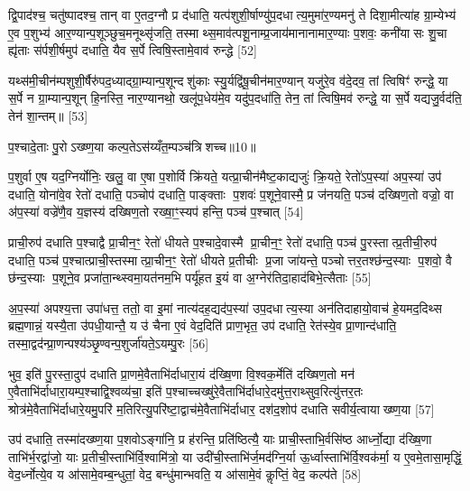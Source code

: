 द्वि॒पाद॑श्च॒ चतु॑ष्पादश्च॒ तान् वा ए॒तद॒ग्नौ प्र द॑धाति॒ यत्प॑शुशी॒र्\mbox{}षाण्यु॑प॒दधात्य॒मुमा॑र॒ण्यमनु॑ ते दिशा॒मीत्या॑ह ग्रा॒म्येभ्य॑ ए॒व प॒शुभ्य॑ आर॒ण्यान्प॒शूञ्छुच॒मनूथ्सृ॑जति॒ तस्माथ्स॒माव॑त्पशू॒नाम्प्र॒जाय॑मानानामार॒ण्याः प॒शवः॒ कनी॑यासः शु॒चा ह्यृ॑ताः स॑र्पशी॒र्\mbox{}षमुप॑ दधाति॒ यैव स॒र्पे त्विषि॒स्तामे॒वाव॑ रुन्द्धे [52]

यथ्स॑मी॒चीन॑म्पशुशी॒र्\mbox{}षैरु॑पद॒ध्याद्ग्रा॒म्यान्प॒शून्दशु॑काः स्यु॒र्यद्वि॑षू॒चीन॑मार॒ण्यान् यजु॑रे॒व व॑दे॒दव॒ तां त्विषिꣳ॑ रुन्द्धे॒ या स॒र्पे न ग्रा॒म्यान्प॒शून् हि॒नस्ति॒ नार॒ण्यानथो॒ खलू॑प॒धेय॑मे॒व यदु॑प॒दधा॑ति॒ तेन॒ तां त्विषि॒मव॑ रुन्द्धे॒ या स॒र्पे यद्यजु॒र्वद॑ति॒ तेन॑ शा॒न्तम्॥ [53]

{\scriptsize {प॒श्चादे॒ताः पु॒रोऽख्ष्ण॒या कल्प॒तेऽस॑य्यँत॒म्पञ्च॑त्रिशच्च॥10॥}}

प॒शुर्वा ए॒ष यद॒ग्निर्योनिः॒ खलु॒ वा ए॒षा प॒शोर्वि क्रि॑यते॒ यत्प्रा॒चीन॑मैष्ट॒काद्यजुः॑ क्रि॒यते॒ रेतो॑ऽप॒स्या॑ अप॒स्या॑ उप॑ दधाति॒ योना॑वे॒व रेतो॑ दधाति॒ पञ्चोप॑ दधाति॒ पाङ्क्ताः प॒शवः॑ प॒शूने॒वास्मै॒ प्र ज॑नयति॒ पञ्च॑ दख्षिण॒तो वज्रो॒ वा अ॑प॒स्या॑ वज्रे॑णै॒व य॒ज्ञस्य॑ दख्षिण॒तो रख्षा॒ꣳ॒स्यप॑ हन्ति॒ पञ्च॑ प॒श्चात् [54]

प्राची॒रुप॑ दधाति प॒श्चाद्वै प्रा॒चीन॒ꣳ॒ रेतो॑ धीयते प॒श्चादे॒वास्मै प्रा॒चीन॒ꣳ॒ रेतो॑ दधाति॒ पञ्च॑ पु॒रस्तात्प्र॒तीची॒रुप॑ दधाति॒ पञ्च॑ प॒श्चात्प्राची॒स्तस्मात्प्रा॒चीन॒ꣳ॒ रेतो॑ धीयते प्र॒तीचीः प्र॒जा जा॑यन्ते॒ पञ्चोत्तर॒तश्छ॑न्द॒स्याः प॒शवो॒ वै छ॑न्द॒स्याः प॒शूने॒व प्रजा॑ता॒न्थ्स्वमा॒यत॑नम॒भि पर्यू॑हत इ॒यं वा अ॒ग्नेर॑तिदा॒हाद॑बिभे॒त्सैताः [55]

अ॒प॒स्या॑ अपश्य॒त्ता उपा॑धत्त॒ ततो॒ वा इ॒मां नात्य॑दह॒द्यद॑प॒स्या॑ उप॒दधात्य॒स्या अन॑तिदाहायो॒वाच॑ हे॒यमद॒दिथ्स ब्रह्म॒णान्नं॒ यस्यै॒ता उ॑पधी॒यान्तै॒ य उ॑ चैना ए॒वं वेद॒दिति॑ प्राण॒भृत॒ उप॑ दधाति॒ रेत॑स्ये॒व प्रा॒णान्द॑धाति॒ तस्मा॒द्वद॑न्प्रा॒णन्पश्य॑ञ्छृ॒ण्वन्प॒शुर्जा॑यते॒ऽयम्पु॒रः [56]

भुव॒ इति॑ पु॒रस्ता॒दुप॑ दधाति प्रा॒णमे॒वैताभि॑र्दाधारा॒यं द॑ख्षि॒णा वि॒श्वक॒र्मेति॑ दख्षिण॒तो मन॑ ए॒वैताभि॑र्दाधारा॒यम्प॒श्चाद्वि॒श्वव्य॑चा॒ इति॑ प॒श्चाच्चख्षु॑रे॒वैताभि॑र्दाधारे॒दमु॑त्त॒राथ्सुव॒रित्यु॑त्तर॒तः श्रोत्र॑मे॒वैताभि॑र्दाधारे॒यमु॒परि॑ म॒तिरित्यु॒परि॑ष्टा॒द्वाच॑मे॒वैताभि॑र्दाधार॒ दश॑द॒शोप॑ दधाति सवीर्य॒त्वायाख्ष्ण॒या [57]

उप॑ दधाति॒ तस्मा॑दख्ष्ण॒या प॒शवोऽङ्गा॑नि॒ प्र ह॑रन्ति॒ प्रति॑ष्ठित्यै॒ याः प्राची॒स्ताभि॒र्वसि॑ष्ठ आर्ध्नो॒द्या द॑ख्षि॒णा ताभि॑र्भ॒रद्वा॑जो॒ याः प्र॒तीची॒स्ताभि॑र्वि॒श्वामि॑त्रो॒ या उदी॑ची॒स्ताभि॑र्ज॒मद॑ग्नि॒र्या ऊ॒र्ध्वास्ताभि॑र्वि॒श्वक॑र्मा॒ य ए॒वमे॒तासा॒मृद्धिं॒ वेद॒र्ध्नोत्ये॒व य आ॑सामे॒वम्ब॒न्धुतां॒ वेद॒ बन्धु॑मान्भवति॒ य आ॑सामे॒वं कॢप्तिं॒ वेद॒ कल्प॑ते [58]

